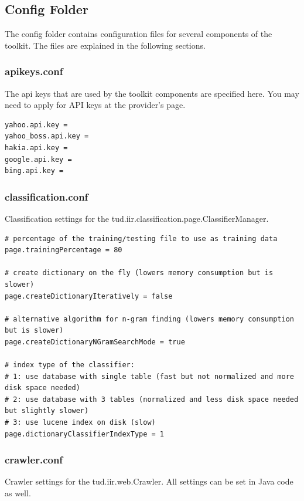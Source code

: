 \documentclass[a4paper,twoside]{article}      %
\begin{document}
\subsection{Config Folder}
The config folder contains configuration files for several components of the toolkit. The files are explained in the following sections.

\subsubsection{apikeys.conf}
\label{sec:apikeys.conf}
The api keys that are used by the toolkit components are specified here. You may need to apply for API keys at the provider's page.

\begin{verbatim}
yahoo.api.key = 
yahoo_boss.api.key = 
hakia.api.key = 
google.api.key = 
bing.api.key = 
\end{verbatim}

\subsubsection{classification.conf}
\label{sec:classification.conf}
Classification settings for the tud.iir.classification.page.ClassifierManager.

\begin{verbatim}
# percentage of the training/testing file to use as training data
page.trainingPercentage = 80

# create dictionary on the fly (lowers memory consumption but is slower)
page.createDictionaryIteratively = false

# alternative algorithm for n-gram finding (lowers memory consumption but is slower)
page.createDictionaryNGramSearchMode = true

# index type of the classifier:
# 1: use database with single table (fast but not normalized and more disk space needed)
# 2: use database with 3 tables (normalized and less disk space needed but slightly slower)
# 3: use lucene index on disk (slow)
page.dictionaryClassifierIndexType = 1
\end{verbatim}

\subsubsection{crawler.conf}
\label{sec:crawler.conf}
Crawler settings for the tud.iir.web.Crawler. All settings can be set in Java code as well.
\end{document}
